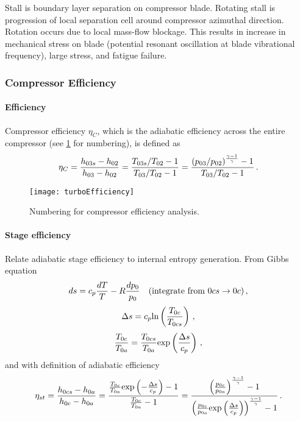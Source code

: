 Stall is boundary layer separation on compressor blade. Rotating stall is progression of local separation cell around compressor azimuthal direction. Rotation occurs due to local mass-flow blockage. This results in increase in mechanical stress on blade (potential resonant oscillation at blade vibrational frequency), large stress, and fatigue failure.

\subsubsection{Compressor Efficiency}
\paragraph*{Efficiency} Compressor efficiency $\eta_C$, which is the adiabatic efficiency across the entire compressor (see \cref{FIG_TURBO_EFFICIENCY} for numbering), is defined as
\begin{equation}
  \eta_C = {\frac{h_{03s}-h_{02}}{h_{03}-h_{02}}} = {\frac{T_{03s}/T_{02}-1}{T_{03}/T_{02}-1}} = {\frac{(p_{03}/p_{02})^{\frac{\gamma-1}{\gamma}}-1}{T_{03}/T_{02}-1}}\,.
\end{equation}

\begin{figure}[!htb!]
 \centering
    {\texttt{[image: turboEfficiency]}}
    \caption{\label{FIG_TURBO_EFFICIENCY}Numbering for compressor efficiency analysis.}
\end{figure}

\paragraph*{Stage efficiency} Relate adiabatic stage efficiency to internal entropy generation. From Gibbs equation
\[
  ds = c_p {\frac{dT}{T}} - R {\frac{dp_0}{p_0}}\quad(\text{integrate from }0cs \rightarrow 0c)\,,
\]
\[
  \Delta s = c_p \text{ln} \left( {\frac{T_{0c}}{T_{0cs}}} \right)\,,
\]
\[
  {\frac{T_{0c}}{T_{0a}}} = {\frac{T_{0cs}}{T_{0a}}}\text{exp}\left({\frac{\Delta s}{c_p}}\right)\,,
\]
and with definition of adiabatic efficiency
\begin{equation}
  \eta_{st} = {\frac{h_{0cs}-h_{0a}}{h_{0c}-h_{0a}}} = {\frac{ {\frac{T_{0c}}{T_{0a}}} \text{exp}\left(-{\frac{\Delta s}{c_p}}\right)-1 }{{\frac{T_{0c}}{T_{0a}}}-1}} = {\frac{ \left({\frac{p_{0c}}{p_{0a}}}\right)^{\frac{\gamma-1}{\gamma}}-1 }{\left({\frac{p_{0c}}{p_{0a}}} \text{exp}\left({\frac{\Delta s}{c_p}}\right) \right)^{\frac{\gamma-1}{\gamma}}-1}} \,.
\end{equation}

